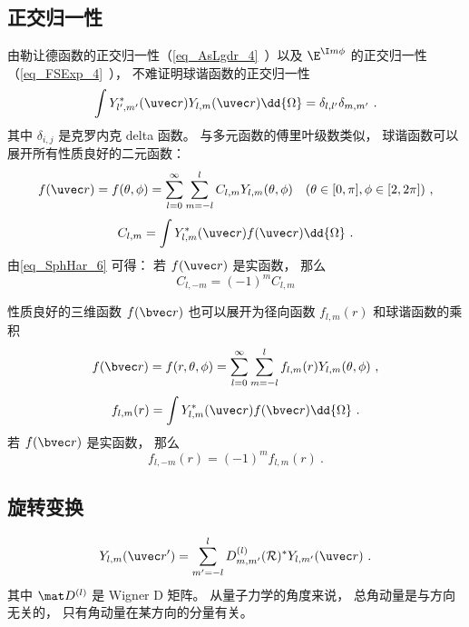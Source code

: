\subsection{正交归一性}
由勒让德函数的正交归一性（\autoref{eq_AsLgdr_4}~）以及 $\E^{\I m \phi}$  的正交归一性（\autoref{eq_FSExp_4}~）， 不难证明球谐函数的正交归一性
\begin{equation}
\int Y_{l', m'}^*(\uvec r) Y_{l, m} (\uvec r) \dd{\Omega} = \delta_{l,l'}\delta_{m,m'}~.
\end{equation}
其中 $\delta_{i,j}$ 是克罗内克 delta 函数。 与多元函数的傅里叶级数类似， 球谐函数可以展开所有性质良好的二元函数：
\begin{equation}
f(\uvec r) = f(\theta, \phi) = \sum_{l = 0}^\infty\sum_{m=-l}^l C_{l,m}Y_{l,m}(\theta, \phi) \quad (\theta \in [0, \pi], \phi \in [2, 2\pi])~,
\end{equation}
\begin{equation}
C_{l,m} = \int Y^*_{l,m}(\uvec r) f(\uvec r) \dd{\Omega}~.
\end{equation}
由\autoref{eq_SphHar_6} 可得： 若 $f(\uvec r)$ 是实函数， 那么
\begin{equation}
C_{l,-m} = (-1)^m C_{l,m}
\end{equation}

性质良好的三维函数 $f(\bvec r)$ 也可以展开为径向函数 $f_{l,m}(r)$ 和球谐函数的乘积
\begin{equation}\label{eq_SphHar_9}
f(\bvec r) = f(r, \theta, \phi) = \sum_{l = 0}^\infty\sum_{m=-l}^l f_{l,m}(r) Y_{l,m}(\theta, \phi)~,
\end{equation}
\begin{equation}\label{eq_SphHar_7}
f_{l,m}(r) = \int Y^*_{l,m}(\uvec r) f(\bvec r) \dd{\Omega}~.
\end{equation}
若 $f(\bvec r)$ 是实函数， 那么
\begin{equation}
f_{l,-m}(r) = (-1)^m f_{l,m}(r)~.
\end{equation}

\subsection{旋转变换}
\begin{equation}
Y_{l,m}(\uvec r') = \sum_{m'=-l}^l D_{m,m'}^{(l)} (\mathcal R)^* Y_{l,m'}(\uvec r)~.
\end{equation}
其中 $\mat D^{(l)}$ 是 Wigner D 矩阵。 从量子力学的角度来说， 总角动量是与方向无关的， 只有角动量在某方向的分量有关。

